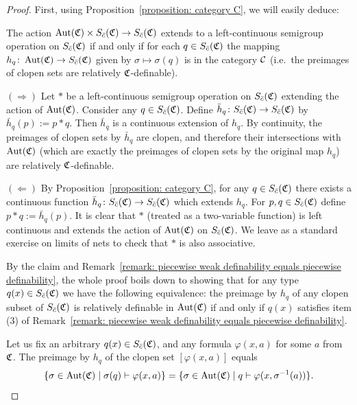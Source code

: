 	\begin{proof}
		First, using Proposition~\ref{proposition: category C}, we will easily deduce:
		\begin{clm*}
			The action $\operatorname{{Aut}}({\mathfrak C})\times S_{\bar c}({\mathfrak C})\to S_{\bar c}({\mathfrak C})$ extends to a left-continuous semigroup operation on $S_{\bar c}({\mathfrak C})$ if and only if for each $q\in S_{\bar c}({\mathfrak C})$ the mapping $h_q \colon \operatorname{{Aut}}({\mathfrak C})\to S_{\bar c}({\mathfrak C})$ given by $\sigma \mapsto \sigma(q)$ is in the category ${\mathcal C}$ (i.e.\ the preimages of clopen sets are relatively ${\mathfrak C}$-definable).
		\end{clm*}
		
		\begin{clmproof}
			$(\Rightarrow)$ Let $*$ be a left-continuous semigroup operation on $S_{\bar c}({\mathfrak C})$ extending the action of $\operatorname{{Aut}}({\mathfrak C})$. Consider any $q \in S_{\bar c}({\mathfrak C})$. Define $\bar h_q \colon S_{\bar c}({\mathfrak C}) \to S_{\bar c}({\mathfrak C})$ by $\bar h_q(p) := p*q$. Then $\bar h_q$ is a continuous extension of $h_q$. By continuity, the preimages of clopen sets by $\bar h_q$ are clopen, and therefore their intersections with $\operatorname{{Aut}}({\mathfrak C})$ (which are exactly the preimages of clopen sets by the original map $h_q$) are relatively ${\mathfrak C}$-definable.
			
			$(\Leftarrow)$ By Proposition~\ref{proposition: category C}, for any $q \in S_{\bar c}({\mathfrak C})$ there exists a continuous function $\bar h_q \colon S_{\bar c}({\mathfrak C}) \to S_{\bar c}({\mathfrak C})$ which extends $h_q$. For $p,q \in S_{\bar c}({\mathfrak C})$ define $p*q := \bar h_q(p)$. It is clear that $*$ (treated as a two-variable function) is left continuous and extends the action of $\operatorname{{Aut}}({\mathfrak C})$ on $S_{\bar c}({\mathfrak C})$. We leave as a standard exercise on limits of nets to check that $*$ is also associative.
		\end{clmproof}
		
		By the claim and Remark~\ref{remark: piecewise weak definability equals piecewise definability}, the whole proof boils down to showing that for any type $q(x) \in S_{\bar c}({\mathfrak C})$ we have the following equivalence: the preimage by $h_q$ of any clopen subset of $S_{\bar c}({\mathfrak C})$ is relatively definable in $\operatorname{{Aut}}({\mathfrak C})$ if and only if $q(x)$ satisfies item (3) of Remark~\ref{remark: piecewise weak definability equals piecewise definability}.
		
		
		Let us fix an arbitrary $q(x) \in S_{\bar c}({\mathfrak C})$, and any formula $\varphi(x,a)$ for some
		$a$ from ${\mathfrak C}$. The preimage by $h_q$ of the clopen set $[\varphi(x,a)]$ equals
		\[
		\{\sigma \in \operatorname{{Aut}}({\mathfrak C})\mid \sigma(q)\vdash \varphi(x,a)\}=\{\sigma \in \operatorname{{Aut}}({\mathfrak C})\mid q\vdash \varphi(x,\sigma^{-1}(a))\}.
		\]
		

\end{proof}

